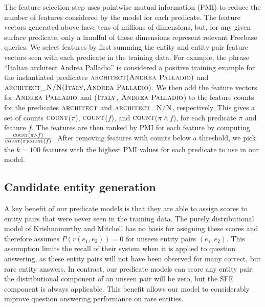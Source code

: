\documentclass[11pt]{article}
\newcommand{\formalpredicate}[1]{\ensuremath{\textsc{#1}}}
\newcommand{\entity}[1]{\ensuremath{\textsc{#1}}}
\begin{document}
The feature selection step uses pointwise mutual information (PMI) to
reduce the number of features considered by the model for each
predicate. The feature vectors generated above have tens of millions
of dimensions, but, for any given surface predicate, only a handful of
these dimensions represent relevant Freebase queries. We select
features by first summing the entity and entity pair feature vectors
seen with each predicate in the training data. For example, the phrase
``Italian architect Andrea Palladio'' is considered a positive
training example for the instantiated predicates
$\formalpredicate{architect}(\entity{Andrea Palladio})$ and
$\formalpredicate{architect\_N/N}(\entity{Italy}, \entity{Andrea
Palladio})$. We then add the feature vectors for \entity{Andrea
Palladio} and (\entity{Italy}, \entity{Andrea Palladio}) to the
feature counts for the predicates \formalpredicate{architect} and
\formalpredicate{architect\_N/N}, respectively. This gives a set of
counts \formalpredicate{count}($\pi$), \formalpredicate{count}($f$),
and \formalpredicate{count}($\pi\land f$), for each predicate $\pi$
and feature $f$.  The features are then ranked by PMI for each feature
by computing $\frac{\formalpredicate{count}(\pi\land
f)}{\formalpredicate{count}(\pi)\formalpredicate{count}(f)}$.  After
removing features with counts below a threshold, we pick the $k=100$
features with the highest PMI values for each predicate to use in our
model.

\subsection{Candidate entity generation}
\label{sec:better-candidates}

A key benefit of our predicate models is that they are able to assign
scores to entity pairs that were never seen in the training data. The
purely distributional model of Krishnamurthy and Mitchell has no basis
for assigning these scores and therefore assumes $P(r(e_1,e_2)) = 0$
for unseen entity pairs $(e_1,e_2)$. This assumption limits the recall
of their system when it is applied to question answering, as these
entity pairs will not have been observed for many correct, but rare
entity answers. In contrast, our predicate models can score any entity
pair: the distributional component of an unseen pair will be zero, but
the SFE component is always applicable. This benefit allows our model
to considerably improve question answering performance on rare
entities.
\end{document}
